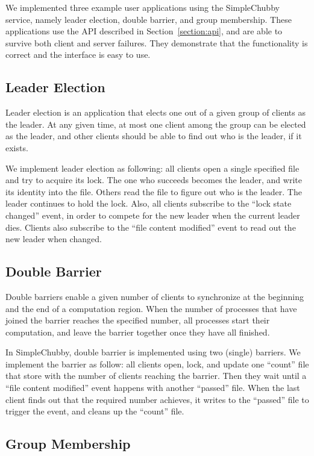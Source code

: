 We implemented three example user applications using the SimpleChubby service,
namely leader election, double barrier, and group membership.
These applications use the API described in Section~\ref{section:api},
and are able to survive both client and server failures. They demonstrate
that the functionality is correct and the interface is easy to use.

\subsection{Leader Election}

Leader election is an application that elects one out of a given group
of clients as the leader. At any given time, at most one client among the
group can be elected as the leader, and other clients should be able to
find out who is the leader, if it exists.

We implement leader election as following: all clients open a single
specified file and try to acquire its lock. The one who succeeds becomes
the leader, and write its identity into the file. Others read the file
to figure out who is the leader. The leader continues to hold the lock.
Also, all clients subscribe to the ``lock state changed'' event, in order
to compete for the new leader when the current leader dies. Clients also
subscribe to the ``file content modified'' event to read out the new
leader when changed.

\subsection{Double Barrier}

Double barriers enable a given number of clients to synchronize at the
beginning and the end of a computation region. When the number of processes
that have joined the barrier reaches the specified number, all processes
start their computation, and leave the barrier together once they have all
finished.

In SimpleChubby, double barrier is implemented using two (single) barriers.
We implement the barrier as follow: all clients open, lock, and update
one ``count'' file that store with the number of clients reaching the barrier.
Then they wait until a ``file content modified'' event happens with another
``passed'' file. When the last client finds out that the required number
achieves, it writes to the ``passed'' file to trigger the event, and cleans
up the ``count'' file.

\subsection{Group Membership}

